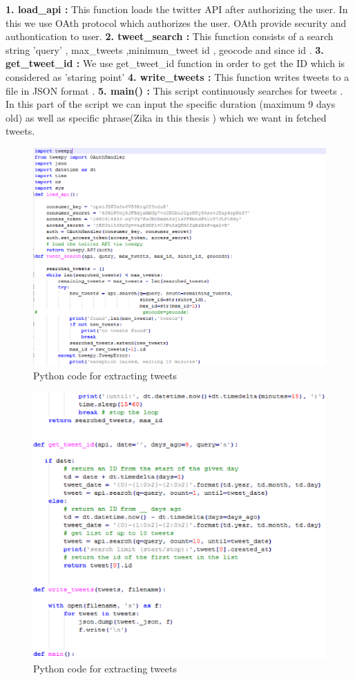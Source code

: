    {\bf 1. load_api :} This function loads the twitter API after authorizing the user. In this we use OAth protocol which authorizes the user. OAth provide security and authontication to user.
   {\bf 2. tweet_search :} This function consists of a search string 'query' , max_tweets ,minimum_tweet id , geocode and since id .
 {\bf 3. get_tweet_id :}  We use get_tweet_id function in order to get the ID which is considered as 'staring point'
  {\bf 4. write_tweets :} This function writes tweets to a file in JSON format .
  {\bf 5. main() :} This script continuously searches for tweets . In this part of the script we can input the specific duration (maximum 9 days old) as well as specific phrase(Zika in this thesis ) which we want in fetched  tweets.




\begin{figure}[h]
\centerline{\includegraphics[width=5.7in]{CODE-0}}
\caption{Python code for extracting tweets}
\end{figure}
\begin{figure}[h]
\centerline{\includegraphics[width=5.7in]{CODE-1}}
\caption{Python code for extracting tweets}
\end{figure}
